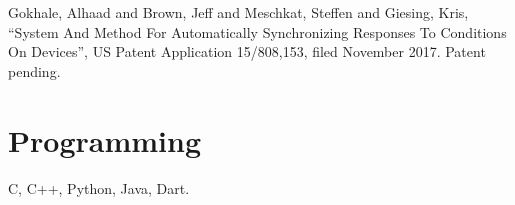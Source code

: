 \documentclass[margin,line]{resume}
\begin{document}
\begin{resume}
    Gokhale, Alhaad and Brown, Jeff and Meschkat, Steffen and Giesing, Kris, 
    ``System And Method For Automatically Synchronizing Responses To Conditions On Devices'',
    US Patent Application 15/808,153, filed November 2017. Patent pending.

    \section{\mysidestyle Programming} 

    C, C++, Python, Java, Dart.


\end{resume}
\end{document}
